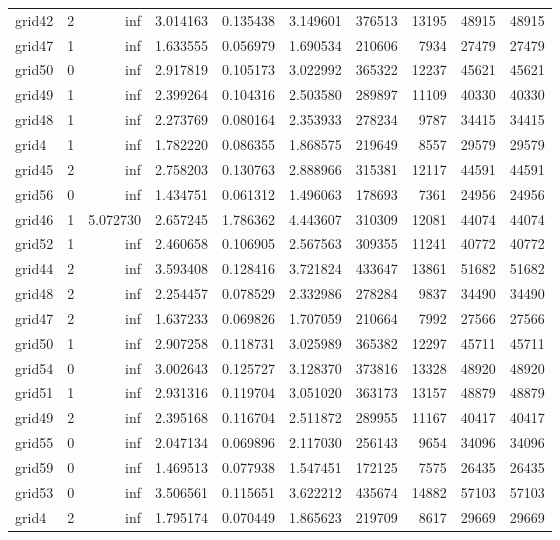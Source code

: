 \documentclass[../../../thesis.tex]{subfiles}
\begin{document}
\begin{longtable}{|l|r|r|r|r|r|r|r|r|r|}
grid42 & 2 & inf & 3.014163 & 0.135438 & 3.149601 & 376513 & 13195 & 48915 & 48915 \\
grid47 & 1 & inf & 1.633555 & 0.056979 & 1.690534 & 210606 & 7934 & 27479 & 27479 \\
grid50 & 0 & inf & 2.917819 & 0.105173 & 3.022992 & 365322 & 12237 & 45621 & 45621 \\
grid49 & 1 & inf & 2.399264 & 0.104316 & 2.503580 & 289897 & 11109 & 40330 & 40330 \\
grid48 & 1 & inf & 2.273769 & 0.080164 & 2.353933 & 278234 & 9787 & 34415 & 34415 \\
grid4 & 1 & inf & 1.782220 & 0.086355 & 1.868575 & 219649 & 8557 & 29579 & 29579 \\
grid45 & 2 & inf & 2.758203 & 0.130763 & 2.888966 & 315381 & 12117 & 44591 & 44591 \\
grid56 & 0 & inf & 1.434751 & 0.061312 & 1.496063 & 178693 & 7361 & 24956 & 24956 \\
grid46 & 1 & 5.072730 & 2.657245 & 1.786362 & 4.443607 & 310309 & 12081 & 44074 & 44074 \\
grid52 & 1 & inf & 2.460658 & 0.106905 & 2.567563 & 309355 & 11241 & 40772 & 40772 \\
grid44 & 2 & inf & 3.593408 & 0.128416 & 3.721824 & 433647 & 13861 & 51682 & 51682 \\
grid48 & 2 & inf & 2.254457 & 0.078529 & 2.332986 & 278284 & 9837 & 34490 & 34490 \\
grid47 & 2 & inf & 1.637233 & 0.069826 & 1.707059 & 210664 & 7992 & 27566 & 27566 \\
grid50 & 1 & inf & 2.907258 & 0.118731 & 3.025989 & 365382 & 12297 & 45711 & 45711 \\
grid54 & 0 & inf & 3.002643 & 0.125727 & 3.128370 & 373816 & 13328 & 48920 & 48920 \\
grid51 & 1 & inf & 2.931316 & 0.119704 & 3.051020 & 363173 & 13157 & 48879 & 48879 \\
grid49 & 2 & inf & 2.395168 & 0.116704 & 2.511872 & 289955 & 11167 & 40417 & 40417 \\
grid55 & 0 & inf & 2.047134 & 0.069896 & 2.117030 & 256143 & 9654 & 34096 & 34096 \\
grid59 & 0 & inf & 1.469513 & 0.077938 & 1.547451 & 172125 & 7575 & 26435 & 26435 \\
grid53 & 0 & inf & 3.506561 & 0.115651 & 3.622212 & 435674 & 14882 & 57103 & 57103 \\
grid4 & 2 & inf & 1.795174 & 0.070449 & 1.865623 & 219709 & 8617 & 29669 & 29669 \\

\end{longtable}
\end{document}
